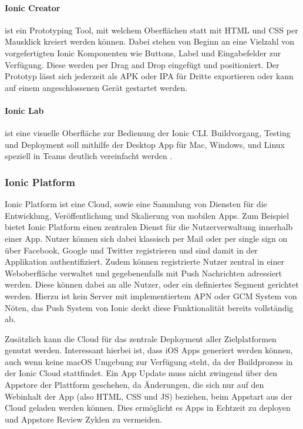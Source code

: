 \paragraph{Ionic Creator}
ist ein Prototyping Tool, mit welchem Oberflächen statt
mit HTML und CSS per Mausklick kreiert werden können.
Dabei stehen von Beginn an eine Vielzahl von vorgefertigten Ionic Komponenten wie Buttons,
Label und Eingabefelder zur Verfügung.
Diese werden per Drag and Drop eingefügt und positioniert. Der Prototyp lässt sich jederzeit
als \ac{APK} oder \ac{IPA} für Dritte exportieren oder kann auf einem angeschlossenen Gerät gestartet werden.

\paragraph{Ionic Lab}
ist eine visuelle Oberfläche zur Bedienung der Ionic \ac{CLI}.
Buildvorgang, Testing und Deployment soll mithilfe der Desktop App für Mac, Windows, und
Linux speziell in Teams deutlich vereinfacht werden \cite{Ionic75:online}.

\subsubsection{Ionic Platform}

Ionic Platform ist eine Cloud, sowie eine Sammlung von Diensten für die Entwicklung,
Veröffentlichung und Skalierung von mobilen Apps. Zum Beispiel bietet Ionic Platform einen zentralen Dienst für die Nutzerverwaltung innerhalb einer App.
Nutzer können sich dabei klassisch per Mail oder per single sign on über
Facebook, Google und Twitter registrieren und sind damit in der Applikation authentifiziert.
Zudem können registrierte Nutzer zentral in einer Weboberfläche verwaltet und gegebenenfalls mit Push Nachrichten adressiert werden.
Diese können dabei an alle Nutzer, oder ein definiertes Segment gerichtet werden.
Hierzu ist kein Server mit implementiertem \ac{APN} oder \ac{GCM} System von Nöten, das Push System von Ionic deckt diese
Funktionalität bereits vollständig ab.

Zusätzlich kann die Cloud für das zentrale Deployment aller Zielplatformen genutzt werden.
Interessant hierbei ist, dass iOS Apps generiert werden können, auch wenn
keine macOS Umgebung zur Verfügung steht, da der Buildprozess in der Ionic Cloud stattfindet.
Ein App Update muss nicht zwingend über den Appstore der Plattform geschehen,
da Änderungen, die sich nur auf den Webinhalt der App (also HTML, CSS und JS) beziehen,
beim Appstart aus der Cloud geladen werden können.
Dies ermöglicht es Apps in Echtzeit zu deployen und Appstore Review Zyklen zu vermeiden.


